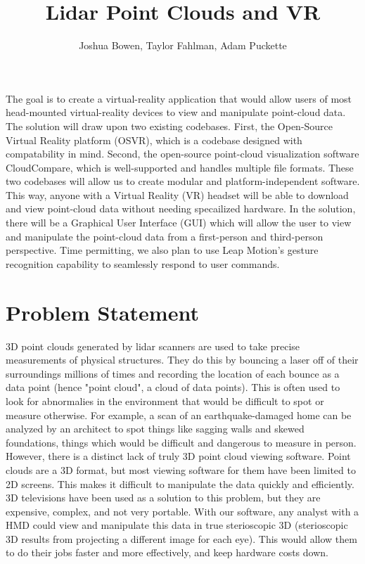 \documentclass{article}
\begin{document}
\title{Lidar Point Clouds and VR}
\author{Joshua Bowen, Taylor Fahlman, Adam Puckette}

\maketitle

\abstract

The goal is to create a virtual-reality application that would allow users of most head-mounted virtual-reality devices to view and manipulate point-cloud data. The solution will draw upon two existing codebases. First, the Open-Source Virtual Reality platform (OSVR), which is a codebase designed with compatability in mind. Second, the open-source point-cloud visualization software CloudCompare, which is well-supported and handles multiple file formats. These two codebases will allow us to create modular and platform-independent software. This way, anyone with a Virtual Reality (VR) headset will be able to download and view point-cloud data without needing specailized hardware. In the solution, there will be a Graphical User Interface (GUI) which will allow the user to view and manipulate the point-cloud data from a first-person and third-person perspective. Time permitting, we also plan to use Leap Motion's gesture recognition capability to seamlessly respond to user commands.

\vfill
\section*{Problem Statement}

3D point clouds generated by lidar scanners are used to take precise measurements of physical structures. They do this by bouncing a laser off of their surroundings millions of times and recording the location of each bounce as a data point (hence "point cloud", a cloud of data points). This is often used to look for abnormalies in the environment that would be difficult to spot or measure otherwise. For example, a scan of an earthquake-damaged home can be analyzed by an architect to spot things like sagging walls and skewed foundations, things which would be difficult and dangerous to measure in person. However, there is a distinct lack of truly 3D point cloud viewing software. Point clouds are a 3D format, but most viewing software for them have been limited to 2D screens. This makes it difficult to manipulate the data quickly and efficiently. 3D televisions have been used as a solution to this problem, but they are expensive, complex, and not very portable. With our software, any analyst  with a HMD could view and manipulate this data in true sterioscopic 3D (sterioscopic 3D results from projecting a different image for each eye). This would allow them to do their jobs faster and more effectively, and keep hardware costs down. 
\end{document}
